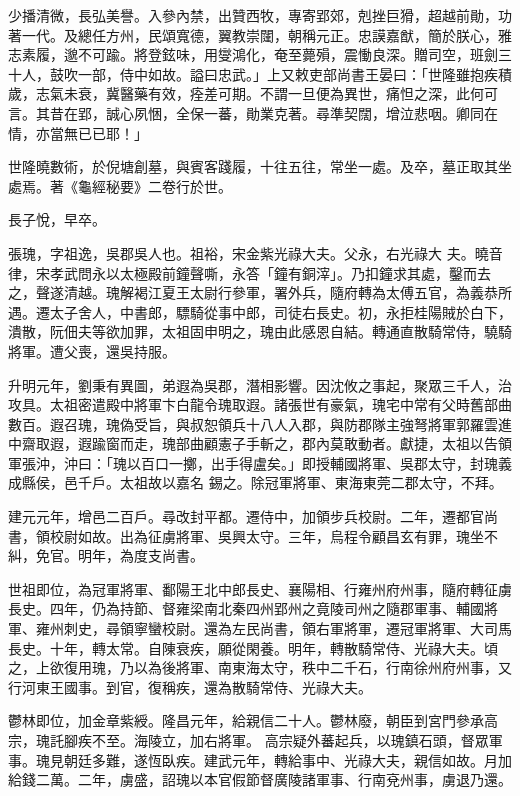 \begin{pinyinscope}
 少播清微，長弘美譽。入參內禁，出贊西牧，專寄郢郊，剋挫巨猾，超越前勛，功著一代。及總任方州，民頌寬德，翼教崇闥，朝稱元正。忠謨嘉猷，簡於朕心，雅志素履，邈不可踰。將登鉉味，用燮鴻化，奄至薨殞，震慟良深。贈司空，班劍三十人，鼓吹一部，侍中如故。謚曰忠武。」上又敕吏部尚書王晏曰：「世隆雖抱疾積歲，志氣未衰，冀醫藥有效，痊差可期。不謂一旦便為異世，痛怛之深，此何可言。其昔在郢，誠心夙悃，全保一蕃，勛業克著。尋準契闊，增泣悲咽。卿同在情，亦當無已已耶！」



 世隆曉數術，於倪塘創墓，與賓客踐履，十往五往，常坐一處。及卒，墓正取其坐處焉。著《龜經秘要》二卷行於世。



 長子悅，早卒。



 張瑰，字祖逸，吳郡吳人也。祖裕，宋金紫光祿大夫。父永，右光祿大
 夫。曉音律，宋孝武問永以太極殿前鐘聲嘶，永答「鐘有銅滓」。乃扣鐘求其處，鑿而去之，聲遂清越。瑰解褐江夏王太尉行參軍，署外兵，隨府轉為太傅五官，為義恭所遇。遷太子舍人，中書郎，驃騎從事中郎，司徒右長史。初，永拒桂陽賊於白下，潰散，阮佃夫等欲加罪，太祖固申明之，瑰由此感恩自結。轉通直散騎常侍，驍騎將軍。遭父喪，還吳持服。



 升明元年，劉秉有異圖，弟遐為吳郡，潛相影響。因沈攸之事起，聚眾三千人，治攻具。太祖密遣殿中將軍卞白龍令瑰取遐。諸張世有豪氣，瑰宅中常有父時舊部曲數百。遐召瑰，瑰偽受旨，與叔恕領兵十八人入郡，與防郡隊主強弩將軍郭羅雲進中齋取遐，遐踰窗而走，瑰部曲顧憲子手斬之，郡內莫敢動者。獻捷，太祖以告領軍張沖，沖曰：「瑰以百口一擲，出手得盧矣。」即授輔國將軍、吳郡太守，封瑰義成縣侯，邑千戶。太祖故以嘉名
 錫之。除冠軍將軍、東海東莞二郡太守，不拜。



 建元元年，增邑二百戶。尋改封平都。遷侍中，加領步兵校尉。二年，遷都官尚書，領校尉如故。出為征虜將軍、吳興太守。三年，烏程令顧昌玄有罪，瑰坐不糾，免官。明年，為度支尚書。



 世祖即位，為冠軍將軍、鄱陽王北中郎長史、襄陽相、行雍州府州事，隨府轉征虜長史。四年，仍為持節、督雍梁南北秦四州郢州之竟陵司州之隨郡軍事、輔國將軍、雍州刺史，尋領寧蠻校尉。還為左民尚書，領右軍將軍，遷冠軍將軍、大司馬長史。十年，轉太常。自陳衰疾，願從閑養。明年，轉散騎常侍、光祿大夫。頃之，上欲復用瑰，乃以為後將軍、南東海太守，秩中二千石，行南徐州府州事，又行河東王國事。到官，復稱疾，還為散騎常侍、光祿大夫。



 鬱林即位，加金章紫綬。隆昌元年，給親信二十人。鬱林廢，朝臣到宮門參承高宗，瑰託腳疾不至。海陵立，加右將軍。
 高宗疑外蕃起兵，以瑰鎮石頭，督眾軍事。瑰見朝廷多難，遂恆臥疾。建武元年，轉給事中、光祿大夫，親信如故。月加給錢二萬。二年，虜盛，詔瑰以本官假節督廣陵諸軍事、行南兗州事，虜退乃還。




\end{pinyinscope}
